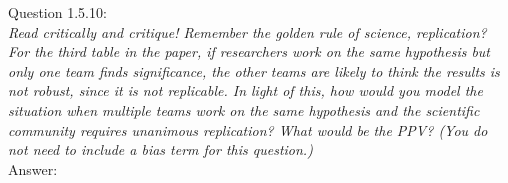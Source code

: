 
Question 1.5.10:\\	
\textsl{Read critically and critique! Remember the golden rule of science, replication? For the third table in the paper, if researchers work on the same hypothesis but only one team finds significance, the other teams are likely to think the results is not robust, since it is not replicable. In light of this, how would you model the situation when multiple teams work on the same hypothesis and the scientific community requires unanimous replication? What would be the PPV? (You do not need to include a bias term for this question.)}\\

Answer:\\

